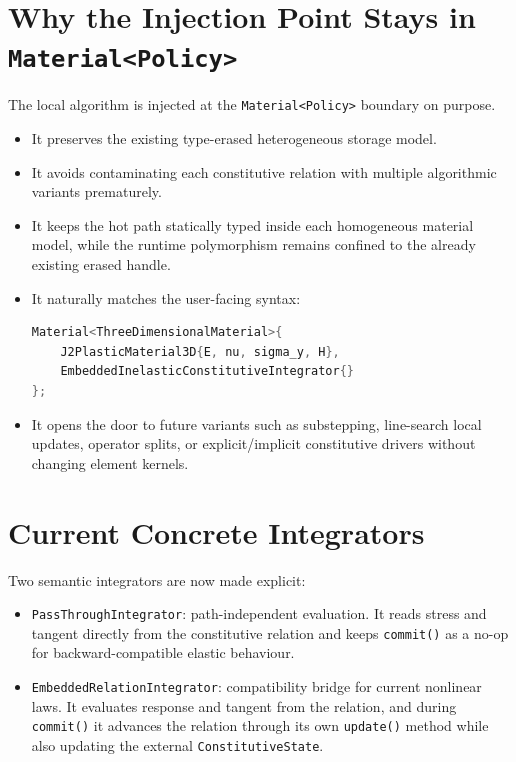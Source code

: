 \section{Why the Injection Point Stays in \texttt{Material<Policy>}}

The local algorithm is injected at the \texttt{Material<Policy>} boundary on
purpose.

\begin{itemize}
  \item It preserves the existing type-erased heterogeneous storage model.
  \item It avoids contaminating each constitutive relation with multiple
        algorithmic variants prematurely.
  \item It keeps the hot path statically typed inside each homogeneous material
        model, while the runtime polymorphism remains confined to the already
        existing erased handle.
  \item It naturally matches the user-facing syntax:
\begin{lstlisting}[language=C++]
Material<ThreeDimensionalMaterial>{
    J2PlasticMaterial3D{E, nu, sigma_y, H},
    EmbeddedInelasticConstitutiveIntegrator{}
};
\end{lstlisting}
  \item It opens the door to future variants such as substepping, line-search
        local updates, operator splits, or explicit/implicit constitutive
        drivers without changing element kernels.
\end{itemize}

\section{Current Concrete Integrators}

Two semantic integrators are now made explicit:

\begin{itemize}
  \item \texttt{PassThroughIntegrator}: path-independent evaluation.  It reads
        stress and tangent directly from the constitutive relation and keeps
        \texttt{commit()} as a no-op for backward-compatible elastic behaviour.
  \item \texttt{EmbeddedRelationIntegrator}: compatibility bridge for current
        nonlinear laws.  It evaluates response and tangent from the relation,
        and during \texttt{commit()} it advances the relation through its own
        \texttt{update()} method while also updating the external
        \texttt{ConstitutiveState}.
\end{itemize}

